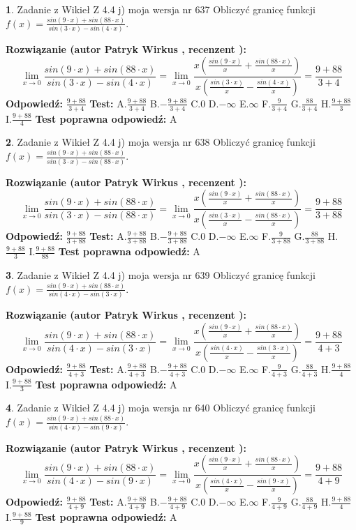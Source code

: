 \documentclass[12pt, a4paper]{article}
\theoremstyle{definition} %
\newtheorem{zad}{}
\newcommand{\zadStart}[1]{\begin{zad}#1\newline}
\newcommand{\zadStop}{\end{zad}}
\newcommand{\rozwStart}[2]{\noindent \textbf{Rozwiązanie (autor #1 , recenzent #2): }\newline}
\newcommand{\rozwStop}{\newline}
\newcommand{\odpStart}{\noindent \textbf{Odpowiedź:}\newline}
\newcommand{\odpStop}{\newline}
\newcommand{\testStart}{\noindent \textbf{Test:}\newline}
\newcommand{\testStop}{\newline}
\newcommand{\kluczStart}{\noindent \textbf{Test poprawna odpowiedź:}\newline}
\newcommand{\kluczStop}{\newline}
\begin{document}
\zadStart{Zadanie z Wikieł Z 4.4 j) moja wersja nr 637}
Obliczyć granicę funkcji $f(x)=\frac{sin(9\cdot x) +sin(88\cdot x)}{sin(3\cdot x) -sin(4\cdot x)}$.
\zadStop
\rozwStart{Patryk Wirkus}{}
$$\lim\limits_{x\to 0}\frac{sin(9\cdot x) +sin(88\cdot x)}{sin(3\cdot x) -sin(4\cdot x)}=\lim\limits_{x\to 0}\frac{x(\frac{sin(9\cdot x)}{x}+\frac{sin(88\cdot x)}{x})}{x(\frac{sin(3\cdot x)}{x}-\frac{sin(4\cdot x)}{x})}=\frac{9+88}{3+4}$$
\rozwStop
\odpStart
$\frac{9+88}{3+4}$
\odpStop
\testStart
A.$\frac{9+88}{3+4}$
B.$-\frac{9+88}{3+4}$
C.$0$
D.$-\infty$
E.$\infty$
F.$\frac{9}{3+4}$
G.$\frac{88}{3+4}$
H.$\frac{9+88}{3}$
I.$\frac{9+88}{4}$
\testStop
\kluczStart
A
\kluczStop



\zadStart{Zadanie z Wikieł Z 4.4 j) moja wersja nr 638}
Obliczyć granicę funkcji $f(x)=\frac{sin(9\cdot x) +sin(88\cdot x)}{sin(3\cdot x) -sin(88\cdot x)}$.
\zadStop
\rozwStart{Patryk Wirkus}{}
$$\lim\limits_{x\to 0}\frac{sin(9\cdot x) +sin(88\cdot x)}{sin(3\cdot x) -sin(88\cdot x)}=\lim\limits_{x\to 0}\frac{x(\frac{sin(9\cdot x)}{x}+\frac{sin(88\cdot x)}{x})}{x(\frac{sin(3\cdot x)}{x}-\frac{sin(88\cdot x)}{x})}=\frac{9+88}{3+88}$$
\rozwStop
\odpStart
$\frac{9+88}{3+88}$
\odpStop
\testStart
A.$\frac{9+88}{3+88}$
B.$-\frac{9+88}{3+88}$
C.$0$
D.$-\infty$
E.$\infty$
F.$\frac{9}{3+88}$
G.$\frac{88}{3+88}$
H.$\frac{9+88}{3}$
I.$\frac{9+88}{88}$
\testStop
\kluczStart
A
\kluczStop



\zadStart{Zadanie z Wikieł Z 4.4 j) moja wersja nr 639}
Obliczyć granicę funkcji $f(x)=\frac{sin(9\cdot x) +sin(88\cdot x)}{sin(4\cdot x) -sin(3\cdot x)}$.
\zadStop
\rozwStart{Patryk Wirkus}{}
$$\lim\limits_{x\to 0}\frac{sin(9\cdot x) +sin(88\cdot x)}{sin(4\cdot x) -sin(3\cdot x)}=\lim\limits_{x\to 0}\frac{x(\frac{sin(9\cdot x)}{x}+\frac{sin(88\cdot x)}{x})}{x(\frac{sin(4\cdot x)}{x}-\frac{sin(3\cdot x)}{x})}=\frac{9+88}{4+3}$$
\rozwStop
\odpStart
$\frac{9+88}{4+3}$
\odpStop
\testStart
A.$\frac{9+88}{4+3}$
B.$-\frac{9+88}{4+3}$
C.$0$
D.$-\infty$
E.$\infty$
F.$\frac{9}{4+3}$
G.$\frac{88}{4+3}$
H.$\frac{9+88}{4}$
I.$\frac{9+88}{3}$
\testStop
\kluczStart
A
\kluczStop



\zadStart{Zadanie z Wikieł Z 4.4 j) moja wersja nr 640}
Obliczyć granicę funkcji $f(x)=\frac{sin(9\cdot x) +sin(88\cdot x)}{sin(4\cdot x) -sin(9\cdot x)}$.
\zadStop
\rozwStart{Patryk Wirkus}{}
$$\lim\limits_{x\to 0}\frac{sin(9\cdot x) +sin(88\cdot x)}{sin(4\cdot x) -sin(9\cdot x)}=\lim\limits_{x\to 0}\frac{x(\frac{sin(9\cdot x)}{x}+\frac{sin(88\cdot x)}{x})}{x(\frac{sin(4\cdot x)}{x}-\frac{sin(9\cdot x)}{x})}=\frac{9+88}{4+9}$$
\rozwStop
\odpStart
$\frac{9+88}{4+9}$
\odpStop
\testStart
A.$\frac{9+88}{4+9}$
B.$-\frac{9+88}{4+9}$
C.$0$
D.$-\infty$
E.$\infty$
F.$\frac{9}{4+9}$
G.$\frac{88}{4+9}$
H.$\frac{9+88}{4}$
I.$\frac{9+88}{9}$
\testStop
\kluczStart
A
\kluczStop
\end{document}
